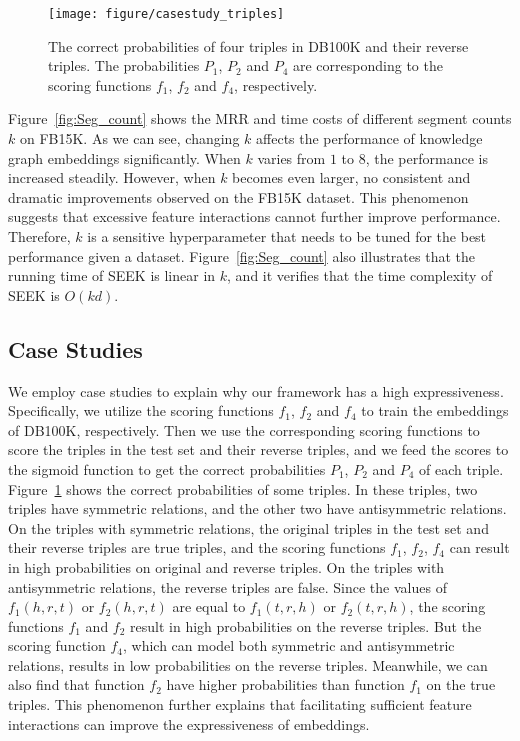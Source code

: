 \documentclass[11pt,a4paper]{article}
\begin{document}
\begin{figure}[!h]
	\centering
	\texttt{[image: figure/casestudy\_triples]}
	\caption{The correct probabilities of four triples in DB100K and their reverse triples. The probabilities $P_1$, $P_2$ and $P_4$ are corresponding to the scoring functions $f_1$, $f_2$ and $f_4$, respectively.}
	\label{fig:case_study}
\end{figure}
Figure~\ref{fig:Seg_count} shows the MRR and time costs of different segment counts $k$ on FB15K. As we can see, changing $k$ affects the performance of knowledge graph embeddings significantly. When $k$ varies from $1$ to $8$, the performance is increased steadily. However, when $k$ becomes even larger, no consistent and dramatic improvements observed on the FB15K dataset. This phenomenon suggests that excessive feature interactions cannot further improve performance. Therefore, $k$ is a sensitive hyperparameter that needs to be tuned for the best performance given a dataset. Figure~\ref{fig:Seg_count} also illustrates that the running time of SEEK is linear in $k$, and it verifies that the time complexity of SEEK is $O(kd)$.


\subsection{Case Studies}
We employ case studies to explain why our framework has a high expressiveness.
Specifically, we utilize the scoring functions $f_1$, $f_2$ and $f_4$ to train the embeddings of DB100K, respectively. Then we use the corresponding scoring functions to score the triples in the test set and their reverse triples, and we feed the scores to the sigmoid function to get the correct probabilities $P_1$, $P_2$ and $P_4$ of each triple.
Figure~\ref{fig:case_study} shows the correct probabilities of some triples. In these triples, two triples have symmetric relations, and the other two have antisymmetric relations. On the triples with symmetric relations, the original triples in the test set and their reverse triples are true triples, and the scoring functions $f_1$, $f_2$, $f_4$ can result in high probabilities on original and reverse triples. On the triples with antisymmetric relations, the reverse triples are false. Since the values of $f_1(h, r, t)$ or $f_2(h, r, t)$ are equal to $f_1(t, r, h)$ or $f_2(t, r, h)$, the scoring functions $f_1$ and $f_2$ result in high probabilities on the reverse triples. But the scoring function $f_4$, which can model both symmetric and antisymmetric relations, results in low probabilities on the reverse triples. Meanwhile, we can also find that function $f_2$ have higher probabilities than function $f_1$ on the true triples. This phenomenon further explains that facilitating sufficient feature interactions can improve the expressiveness of embeddings.
\end{document}
